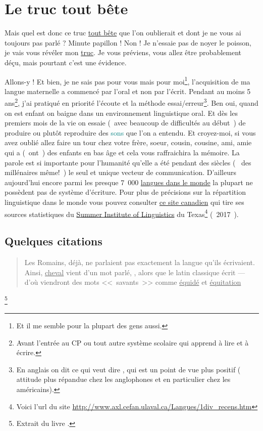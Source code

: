 \section{Le truc tout bête}\label{sec:truc}
Mais quel est donc ce truc \underline{tout bête} que l'on oublierait et dont je
ne vous ai toujours pas parlé ? Minute papillon ! Non ! Je n'essaie
pas de noyer le poisson, je vais vous révéler mon \underline{truc}. Je vous
préviens, vous allez être probablement déçu, mais pourtant c'est une
évidence. \par
Allons-y ! Et bien, je ne sais pas pour vous mais pour moi\footnote{Et il me
semble pour la plupart des gens aussi.}, l'acquisition de ma langue
maternelle a commencé par l'oral et non par l'écrit. Pendant au moins
5 ans\footnote{Avant l'entrée au CP ou tout autre système scolaire qui
apprend à lire et à écrire.}, j'ai pratiqué en priorité l'écoute et la
méthode essai/erreur\footnote{En anglais on dit  ce qui veut
dire , qui est un point de vue plus positif (
attitude plus répandue chez les anglophones et en particulier chez les américains).}. Ben
oui, quand on est enfant on baigne dans un environnement linguistique
oral. Et dès les premiers mois de la vie on essaie (~avec beaucoup de
difficultés au début~) de produire ou plutôt reproduire des \textcolor{teal}{sons} que
l'on a entendu. Et croyez-moi, si vous avez oublié allez faire un tour
chez votre frère, soeur, cousin, cousine, ami, amie qui a (~ont~) des
enfants en bas âge et cela vous raffraichira la mémoire. La parole est
si importante pour l'humanité qu'elle a été pendant des siècles (~ des
millénaires même!~) le seul et unique vecteur de
communication. D'ailleurs aujourd'hui encore parmi les presque 7~000
\href{http://www.museedelhomme.fr/fr/combien-langues-sont-parlees-monde}{langues dans le monde} la plupart ne possèdent pas de système
d'écriture. Pour plus de précisions sur la répartition linguistique
dans le monde vous pouvez consulter \href{http://www.axl.cefan.ulaval.ca/Langues/1div\_recens.htm}{ce site canadien} qui tire ses
sources statistiques du \underline{Summer Institute of Linguistics} du
Texas\footnote{Voici l'url du site
  \url{http://www.axl.cefan.ulaval.ca/Langues/1div_recens.htm}}
(~2017~).\par

\subsection{Quelques citations}\label{subsec:quote}
\begin{quote}
Les Romains, déjà, ne parlaient pas exactement la langue qu'ils
écrivaient. Ainsi, \underline{cheval} vient d'un mot parlé, , alors
que le latin classique écrit  --- d'où viendront des mots <<~savants~>> comme \underline{équidé} et \underline{équitation}
\end{quote}\footnote{Extrait du livre \FL.}

